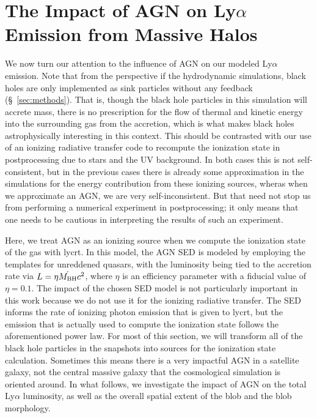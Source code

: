 \chapter{The Impact of AGN on Ly\texorpdfstring{$\alpha$}{a} Emission from Massive Halos}
\label{sec:agn}

We now turn our attention to the influence of AGN on our modeled Ly$\alpha$ emission.
Note that from the perspective if the hydrodynamic simulations, black holes are only implemented as sink particles without any feedback (\S~\ref{sec:methods}).
That is, though the black hole particles in this simulation will accrete mass, there is no prescription for the flow of thermal and kinetic energy into the surrounding gas from the accretion, which is what makes black holes astrophysically interesting in this context.
This should be contrasted with our use of an ionizing radiative transfer code to recompute the ionization state in postprocessing due to stars and the UV background.
In both cases this is not self-consistent, but in the previous cases there is already some approximation in the simulations for the energy contribution from these ionizing sources, wheras when we approximate an AGN, we are very self-inconsistent.
But that need not stop us from performing a numerical experiment in postprocessing; it only means that one needs to be cautious in interpreting the results of such an experiment.

Here, we treat AGN as an ionizing source when we compute the ionization state of the gas with {\sc lycrt}.
In this model, the AGN SED is modeled by employing the \citet*{Hopkins2007} templates for unreddened quasars, with the luminosity being tied to the accretion rate via $L = \eta \dot{M_{\rm BH}} c^2$, where $\eta$ is an efficiency parameter with a fiducial value of $\eta = 0.1$.
The impact of the chosen SED model is not particularly important in this work because we do not use it for the ionizing radiative transfer.
The SED informs the rate of ionizing photon emission that is given to {\sc lycrt}, but the emission that is actually used to compute the ionization state follows the aforementioned power law.
For most of this section, we will transform all of the black hole particles in the snapshots into sources for the ionization state calculation.
Sometimes this means there is a very impactful AGN in a satellite galaxy, not the central massive galaxy that the cosmological simulation is oriented around.
In what follows, we investigate the impact of AGN on the total Ly$\alpha$ luminosity, as well as the overall spatial extent of the blob and the blob morphology.


